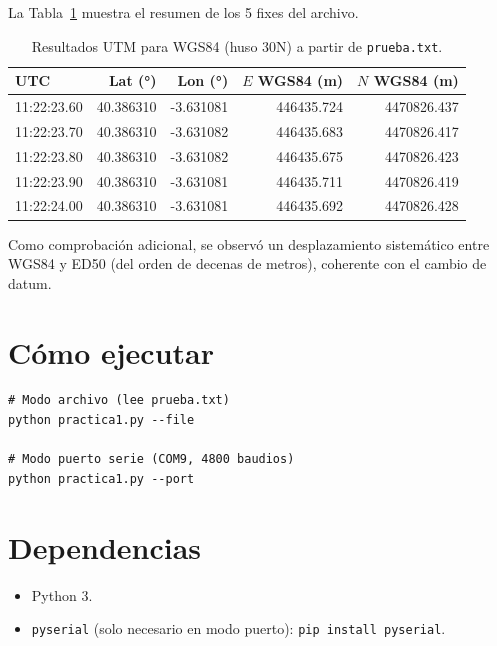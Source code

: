 \documentclass[10pt]{article}
\begin{document}
La Tabla~\ref{tab:res} muestra el resumen de los 5 fixes del archivo.

\begin{table}[h]
\centering
\renewcommand{\arraystretch}{1.1}
\begin{tabular}{@{}lrr|rr@{}}
\toprule
\textbf{UTC} & \textbf{Lat (°)} & \textbf{Lon (°)} & \textbf{$E$ WGS84 (m)} & \textbf{$N$ WGS84 (m)} \\
\midrule
11:22:23.60 & 40.386310 & -3.631081 & 446435.724 & 4470826.437 \\
11:22:23.70 & 40.386310 & -3.631082 & 446435.683 & 4470826.417 \\
11:22:23.80 & 40.386310 & -3.631082 & 446435.675 & 4470826.423 \\
11:22:23.90 & 40.386310 & -3.631081 & 446435.711 & 4470826.419 \\
11:22:24.00 & 40.386310 & -3.631081 & 446435.692 & 4470826.428 \\
\bottomrule
\end{tabular}
\caption{Resultados UTM para WGS84 (huso 30N) a partir de \texttt{prueba.txt}.}
\label{tab:res}
\end{table}

\vspace{0.5em}
Como comprobación adicional, se observó un desplazamiento sistemático entre WGS84 y ED50 (del orden de decenas de metros), coherente con el cambio de datum.

\section{Cómo ejecutar}
\begin{lstlisting}[style=pythonEstilo]
# Modo archivo (lee prueba.txt)
python practica1.py --file

# Modo puerto serie (COM9, 4800 baudios)
python practica1.py --port
\end{lstlisting}

\section{Dependencias}
\begin{itemize}[leftmargin=1.2em]
\item Python 3.
\item \texttt{pyserial} (solo necesario en modo puerto): \texttt{pip install pyserial}.
\end{itemize}
\end{document}
